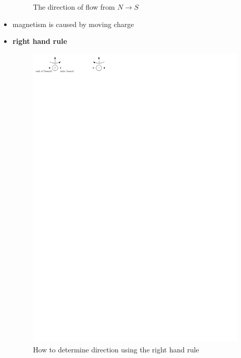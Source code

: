 \documentclass{article}
\begin{document}
\begin{itemize}
\begin{figure}[H]
        \caption{The direction of flow from $N\rightarrow S$}
      \end{figure}
      \item magnetism is caused by moving charge
      \item \textbf{right hand rule}
      \begin{figure}[H]
        \centering
        \includegraphics{figures/rhrule.pdf}
        \caption{How to determine direction using the right hand rule}
      \end{figure}
      \begin{figure}[H]
        \centering

\end{figure}
\end{itemize}
\end{document}
